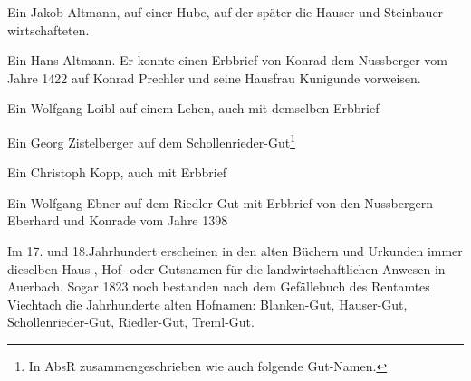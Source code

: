 \documentclass[12pt,a4pager,draft]{book}
\begin{document}
\begin{compactitem}
\item Ein Jakob Altmann, auf einer Hube, auf der später die Hauser und
Steinbauer wirtschafteten.
\item Ein Hans Altmann. Er konnte einen Erbbrief von Konrad dem Nussberger vom
Jahre 1422 auf Konrad Prechler und seine Hausfrau Kunigunde vorweisen.
\item Ein Wolfgang Loibl auf einem Lehen, auch mit demselben Erbbrief
\item Ein Georg Zistelberger auf dem Schollenrieder-Gut\footnote{In AbsR
zusammengeschrieben wie auch folgende Gut-Namen.}
\item Ein Christoph Kopp, auch mit Erbbrief
\item Ein Wolfgang Ebner auf dem Riedler-Gut mit Erbbrief von den Nussbergern
Eberhard und Konrade vom Jahre 1398
\end{compactitem}

Im 17. und 18.Jahrhundert erscheinen in den alten Büchern und Urkunden immer
dieselben Haus-, Hof- oder Gutsnamen für die landwirtschaftlichen Anwesen in
Auerbach. Sogar 1823 noch bestanden nach dem Gefällebuch des Rentamtes Viechtach
die Jahrhunderte alten Hofnamen: Blanken-Gut, Hauser-Gut, Schollenrieder-Gut,
Riedler-Gut, Treml-Gut.
\end{document}
